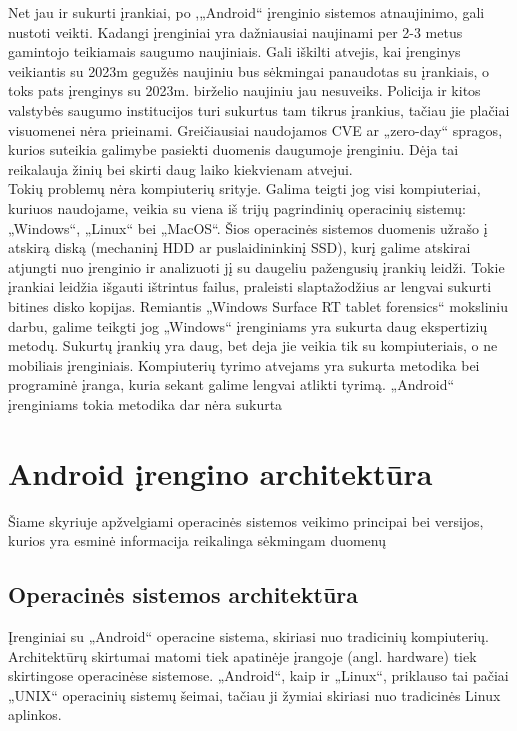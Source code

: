 \documentclass[a4paper,12pt,fleqn]{article}
\begin{document}
Net jau ir sukurti įrankiai, po ,„Android“ įrenginio sistemos atnaujinimo, gali nustoti veikti. 
Kadangi įrenginiai yra dažniausiai naujinami per 2-3 metus gamintojo teikiamais saugumo naujiniais. Gali iškilti atvejis, kai įrenginys veikiantis su 2023m gegužės naujiniu bus sėkmingai panaudotas su įrankiais, o toks pats įrenginys su 2023m. birželio naujiniu jau nesuveiks. Policija ir kitos valstybės saugumo institucijos turi sukurtus tam tikrus įrankius, tačiau jie plačiai visuomenei nėra prieinami. Greičiausiai naudojamos CVE ar „zero-day“ spragos, kurios suteikia galimybe pasiekti duomenis daugumoje įrenginiu. Dėja tai reikalauja žinių bei skirti daug laiko kiekvienam atvejui.\\


Tokių problemų nėra kompiuterių srityje. Galima teigti jog visi kompiuteriai, kuriuos naudojame, veikia su viena iš trijų pagrindinių operacinių sistemų: „Windows“, „Linux“ bei „MacOS“. Šios operacinės sistemos duomenis užrašo į atskirą diską (mechaninį HDD ar puslaidininkinį SSD), kurį galime atskirai atjungti nuo įrenginio ir analizuoti jį su daugeliu pažengusių įrankių leidži. Tokie įrankiai leidžia išgauti ištrintus failus, praleisti slaptažodžius ar lengvai sukurti bitines disko kopijas. Remiantis „Windows Surface RT tablet forensics“ moksliniu darbu, galime teikgti jog „Windows“ įrenginiams yra sukurta daug ekspertizių metodų. \cite{SurfaceRTForensics}
Sukurtų įrankių yra daug, bet deja jie veikia tik su kompiuteriais, o ne mobiliais įrenginiais. Kompiuterių tyrimo atvejams yra sukurta metodika bei programinė įranga, kuria sekant galime lengvai atlikti tyrimą. „Android“ įrenginiams tokia metodika dar nėra sukurta\\

\newpage
\section{Android įrengino architektūra}
Šiame skyriuje apžvelgiami operacinės sistemos veikimo principai bei versijos, kurios yra esminė informacija reikalinga sėkmingam duomenų
\subsection{Operacinės sistemos architektūra}
Įrenginiai su „Android“ operacine sistema, skiriasi nuo tradicinių kompiuterių. Architektūrų skirtumai matomi tiek apatinėje įrangoje (angl. hardware) tiek skirtingose operacinėse sistemose. „Android“, kaip ir „Linux“, priklauso tai pačiai „UNIX“ operacinių sistemų šeimai, tačiau ji žymiai skiriasi nuo tradicinės Linux aplinkos.\cite{AndroidLinuxDifferences}
\end{document}
